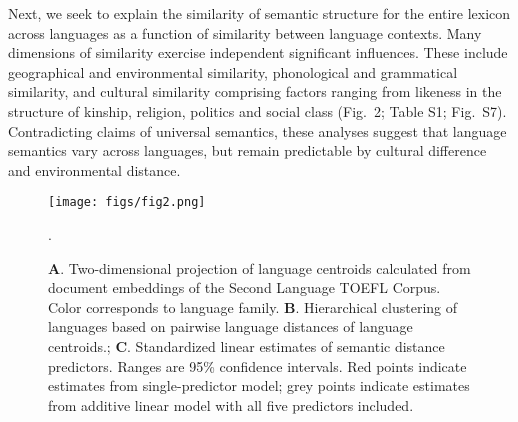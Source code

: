 \documentclass[9pt,twocolumn,twoside,lineno]{pnas-new}
\begin{document}
Next, we seek to explain the similarity of semantic structure for the entire lexicon across languages as a function of similarity between language contexts. Many dimensions of similarity exercise independent significant influences. These include geographical and environmental similarity, phonological and grammatical similarity, and cultural similarity comprising factors ranging from likeness in the structure of kinship, religion, politics and social class (Fig.\ 2; Table S1; Fig.\ S7). Contradicting claims of universal semantics, these analyses suggest that language semantics vary across languages, but remain predictable by cultural difference and environmental distance. 

\begin{figure*}[t!]
\centering
\texttt{[image: figs/fig2.png]}
\caption{{\textbf A.} Two-dimensional projection of language centroids calculated from  document embeddings of the Second Language TOEFL Corpus. Color corresponds to language family. {\textbf B.} Hierarchical clustering of languages based on pairwise language distances of language centroids.; {\textbf C.} Standardized linear estimates of semantic distance predictors. Ranges are 95\% confidence intervals. Red points indicate estimates from single-predictor model; grey points indicate estimates from additive linear model with all five predictors included.}.
\label{fig:fig2} 
\end{figure*}



\end{document}
